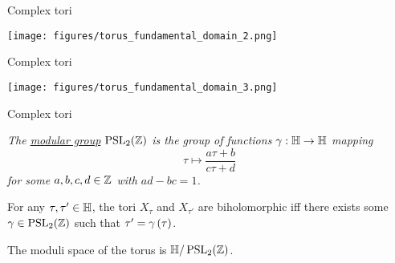\documentclass{beamer}
\begin{document}
    \begin{frame}{Complex tori}
        \begin{center}
            \texttt{[image: figures/torus\_fundamental\_domain\_2.png]}
        \end{center}
    \end{frame}
    \begin{frame}{Complex tori}
        \begin{center}
            \texttt{[image: figures/torus\_fundamental\_domain\_3.png]}
        \end{center}
    \end{frame}
    \begin{frame}{Complex tori}
        \begin{definition}
            \textit{The \ul{modular group} $\operatorname{PSL}_{2}\!\left(\mathbb{Z}\right)$ is the group of functions $\gamma:\mathbb{H}\to\mathbb{H}$ mapping}
            \begin{equation*}
                \tau\mapsto\frac{a\tau+b}{c\tau+d}
            \end{equation*}
            \textit{for some $a,b,c,d\in\mathbb{Z}$ with $ad-bc=1$.}
        \end{definition}

        \pause

        \begin{theorem}
            For any $\tau,\tau'\in\mathbb{H}$, the tori $X_\tau$ and $X_{\tau'}$ are biholomorphic iff there exists some $\gamma\in\operatorname{PSL}_{2}\!\left(\mathbb{Z}\right)$ such that $\tau'=\gamma\left(\tau\right)$.
        \end{theorem}

        \pause

        \begin{corollary}
            The moduli space of the torus is $\mathbb{H}/\operatorname{PSL}_{2}\!\left(\mathbb{Z}\right)$.
        \end{corollary}
    \end{frame}
\end{document}
